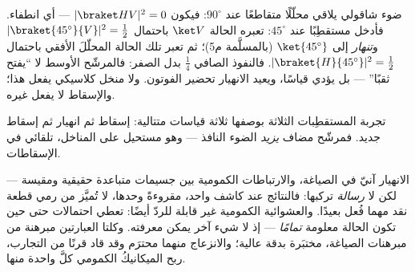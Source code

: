 \begin{example}\label{ex:b3:quantum-formalism:threepolarizers}
ضوء شاقولي يلاقي محلّلًا متقاطعًا عند $90^\circ$: فيكون $|\braket
HV|^2 = 0$ --- أي انطفاء. فأدخل مستقطِبًا عند $45^\circ$: تعبره
الحالة $\ket V$ باحتمال $|\braket{45^\circ}{V}|^2 =
\tfrac12$ و\emph{تنهار} إلى $\ket{45^\circ}$ (بالمسلَّمة م5)؛ ثم تعبر تلك الحالة
المحلّلَ الأفقي باحتمال
$|\braket{H}{45^\circ}|^2 = \tfrac12$. فالنفوذ الصافي $\tfrac14$
بدل الصفر: فالمرشّح الأوسط لا ``يفتح ثقبًا'' --- بل
يؤدي قياسًا، ويعيد الانهيار تحضير الفوتون. ولا منخل
كلاسيكي يفعل هذا؛ والإسقاط لا يفعل غيره.
\end{example}

\begin{omfigure}

{\small تجربة المستقطِبات الثلاثة بوصفها ثلاثة قياسات
متتالية: إسقاط ثم انهيار ثم إسقاط جديد. فمرشّح مضاف
\emph{يزيد} الضوء النافذ --- وهو مستحيل على المناخل،
تلقائي في الإسقاطات.}
\end{omfigure}

\begin{remark}\label{rem:b3:quantum-formalism:nosignal}
الانهيار آنيّ في الصياغة، والارتباطات الكمومية
بين جسيمات متباعدة حقيقية ومقيسة --- لكن لا \emph{رسالة}
تركبها: فالنتائج عند كاشف واحد، مقروءةً وحدها، لا تُميَّز
من رمي قطعة نقد مهما فُعل بعيدًا. والعشوائية الكمومية غير
قابلة للردّ أيضًا:  تعطي احتمالات حتى حين تكون الحالة
معلومة \emph{تمامًا} --- إذ لا شيء آخر يمكن معرفته. وكلتا العبارتين
مبرهنة من مبرهنات الصياغة، مختبَرة بدقة عالية؛ والانزعاج منهما
محترَم وقد قاد قرنًا من التجارب، ربح الميكانيكُ الكمومي كلَّ
واحدة منها.
\end{remark}

